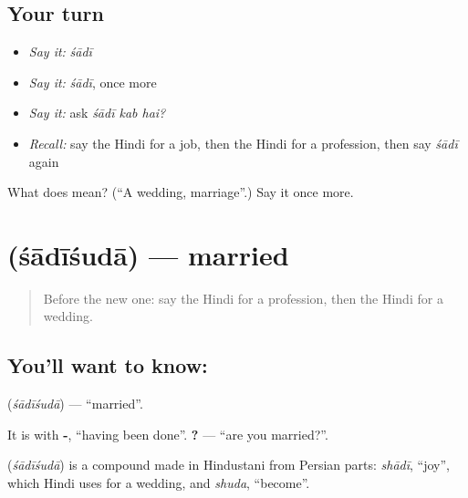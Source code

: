 \subsection*{Your turn}
\begin{itemize}
\raggedright
  \item \emph{Say it:} \emph{śādī}
  \item \emph{Say it:} \emph{śādī}, once more
  \item \emph{Say it:} ask \emph{śādī kab hai?}
  \item \emph{Recall:} say the Hindi for a job, then the Hindi for a profession, then say \emph{śādī} again
\end{itemize}

\begin{tcolorbox}[breakable,colback=teal!4,colframe=teal!35!black,title={Before you move on}]
What does  mean? (\textquotedblleft{}A wedding, marriage\textquotedblright{}.) Say it once more.
\end{tcolorbox}
\section[\texorpdfstring{\hi{शादीशुदा} (śādīśudā)}{शादीशुदा (śādīśudā)}]{ (śādīśudā) — married}

\label{lesson:HI-C119-shadishuda}



\begin{quote}
Before the new one: say the Hindi for a profession, then the Hindi for a wedding.
\end{quote}

\subsection*{You'll want to know: }
\textbf{} (\emph{śādīśudā}) — \textquotedblleft{}married\textquotedblright{}.

It is \textbf{} with \textbf{-}, \textquotedblleft{}having been done\textquotedblright{}. \textbf{   ?} — \textquotedblleft{}are you married?\textquotedblright{}.

\begin{cousinweb}
\textbf{} (\emph{śādīśudā}) is a compound made in Hindustani from Persian parts: \emph{shādī}, \textquotedblleft{}joy\textquotedblright{}, which Hindi uses for a wedding, and \emph{shuda}, \textquotedblleft{}become\textquotedblright{}.
\end{cousinweb}

